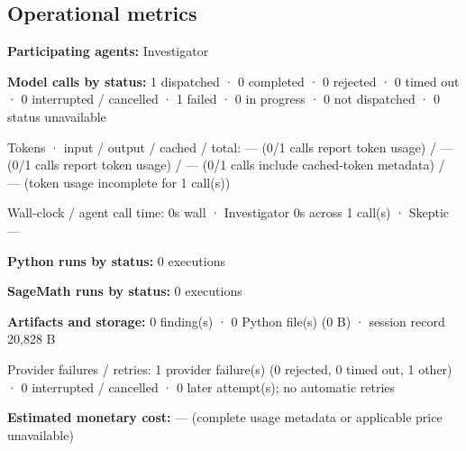 \documentclass[11pt]{article}
\begin{document}
\subsection{Operational metrics}
\textbf{Participating agents:} Investigator\par
\textbf{Model calls by status:} 1 dispatched · 0 completed · 0 rejected · 0 timed out · 0 interrupted / cancelled · 1 failed · 0 in progress · 0 not dispatched · 0 status unavailable\par
Tokens · input / output / cached / total: — (0/1 calls report token usage) / — (0/1 calls report token usage) / — (0/1 calls include cached-token metadata) / — (token usage incomplete for 1 call(s))\par
Wall-clock / agent call time: 0s wall · Investigator 0s across 1 call(s) · Skeptic —\par
\textbf{Python runs by status:} 0 executions\par
\textbf{SageMath runs by status:} 0 executions\par
\textbf{Artifacts and storage:} 0 finding(s) · 0 Python file(s) (0 B) · session record 20,828 B\par
Provider failures / retries: 1 provider failure(s) (0 rejected, 0 timed out, 1 other) · 0 interrupted / cancelled · 0 later attempt(s); no automatic retries\par
\textbf{Estimated monetary cost:} — (complete usage metadata or applicable price unavailable)\par
\end{document}
